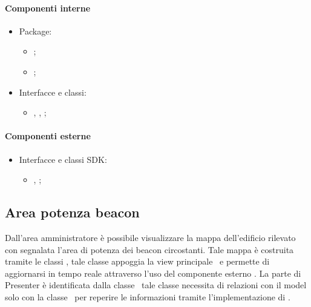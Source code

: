 \documentclass[../Funzionalita.tex]{subfiles}
\begin{document}
		\paragraph*{Componenti interne}
			\begin{itemize}
				\item Package:
				\begin{itemize}
					\item[] \model;
					\item[] \usersetting;
				\end{itemize}
				
				\item Interfacce e classi:
				\begin{itemize}
					\item[] \InformationManager, \InformationManagerImp, \Setting;
				\end{itemize}
			\end{itemize}
		
		\paragraph*{Componenti esterne}
			\begin{itemize}
				\item Interfacce e classi SDK:
				\begin{itemize}
					\item[] \SharedPreferences, \Log;
				\end{itemize}
			\end{itemize}
			
	\newpage
		\subsection{Area potenza beacon}
			Dall'area amministratore è possibile visualizzare la mappa dell'edificio rilevato con segnalata l'area di potenza dei beacon circostanti. Tale mappa è costruita tramite le classi \BeaconPowerArea, tale classe appoggia la view principale \BeaconPowerAreaView\ e permette di aggiornarsi in tempo reale attraverso l'uso del componente esterno \Canvas. La parte di Presenter è identificata dalla classe \BeaconPowerAreaActivity\ tale classe necessita di relazioni con il model solo con la classe \InformationManager\ per reperire le informazioni tramite l'implementazione di \InformationListener.
		
\end{document}
